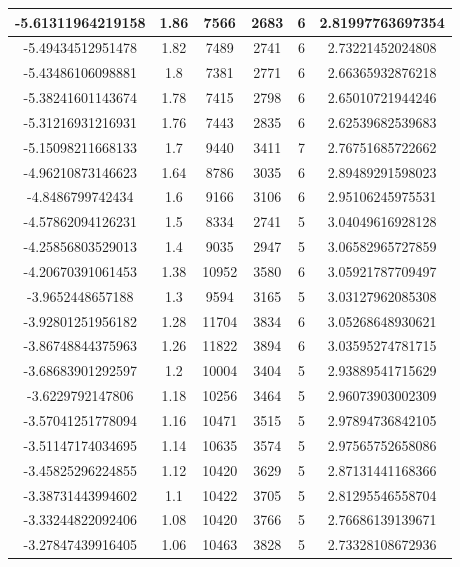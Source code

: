 \documentclass[a4paper]{report}
\numberwithin{equation}{section}
\begin{document}
\begin{table}[!ht]
\begin{tabular}{|c|c|c|c|c|c|}
        -5.61311964219158 & 1.86 & 7566 & 2683 & 6 & 2.81997763697354 \\ \hline
        -5.49434512951478 & 1.82 & 7489 & 2741 & 6 & 2.73221452024808 \\ \hline
        -5.43486106098881 & 1.8 & 7381 & 2771 & 6 & 2.66365932876218 \\ \hline
        -5.38241601143674 & 1.78 & 7415 & 2798 & 6 & 2.65010721944246 \\ \hline
        -5.31216931216931 & 1.76 & 7443 & 2835 & 6 & 2.62539682539683 \\ \hline
        -5.15098211668133 & 1.7 & 9440 & 3411 & 7 & 2.76751685722662 \\ \hline
        -4.96210873146623 & 1.64 & 8786 & 3035 & 6 & 2.89489291598023 \\ \hline
        -4.8486799742434 & 1.6 & 9166 & 3106 & 6 & 2.95106245975531 \\ \hline
        -4.57862094126231 & 1.5 & 8334 & 2741 & 5 & 3.04049616928128 \\ \hline
        -4.25856803529013 & 1.4 & 9035 & 2947 & 5 & 3.06582965727859 \\ \hline
        -4.20670391061453 & 1.38 & 10952 & 3580 & 6 & 3.05921787709497 \\ \hline
        -3.9652448657188 & 1.3 & 9594 & 3165 & 5 & 3.03127962085308 \\ \hline
        -3.92801251956182 & 1.28 & 11704 & 3834 & 6 & 3.05268648930621 \\ \hline
        -3.86748844375963 & 1.26 & 11822 & 3894 & 6 & 3.03595274781715 \\ \hline
        -3.68683901292597 & 1.2 & 10004 & 3404 & 5 & 2.93889541715629 \\ \hline
        -3.6229792147806 & 1.18 & 10256 & 3464 & 5 & 2.96073903002309 \\ \hline
        -3.57041251778094 & 1.16 & 10471 & 3515 & 5 & 2.97894736842105 \\ \hline
        -3.51147174034695 & 1.14 & 10635 & 3574 & 5 & 2.97565752658086 \\ \hline
        -3.45825296224855 & 1.12 & 10420 & 3629 & 5 & 2.87131441168366 \\ \hline
        -3.38731443994602 & 1.1 & 10422 & 3705 & 5 & 2.81295546558704 \\ \hline
        -3.33244822092406 & 1.08 & 10420 & 3766 & 5 & 2.76686139139671 \\ \hline
        -3.27847439916405 & 1.06 & 10463 & 3828 & 5 & 2.73328108672936 \\ \hline

\end{tabular}
\end{table}
\end{document}
